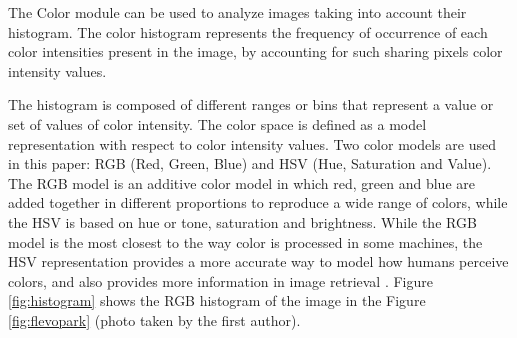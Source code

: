 \documentclass[a4paper,twoside]{article}
\begin{document}

The Color module can be used to analyze images taking into account their histogram. The color histogram represents the frequency of occurrence of each color intensities present in the image, by accounting for such sharing pixels color intensity values.

The histogram is composed of different ranges or bins that represent a value or set of values of color intensity. The color space is defined as a model representation with respect to color intensity values. Two color models are used in this paper: RGB (Red, Green, Blue) and HSV (Hue, Saturation and Value). The RGB model is an additive color model in which red, green and blue are added together in different proportions to reproduce a wide range of colors, while the HSV is based on hue or tone, saturation and brightness. While the RGB model is the most closest to the way color is processed in some machines, the HSV representation provides a more accurate way to model how humans perceive colors, and also provides more information in image retrieval \cite{COLORDIFFERENCES}.
Figure \ref{fig:histogram} shows the RGB histogram of the image in the Figure \ref{fig:flevopark} (photo taken by the first author).
\end{document}
